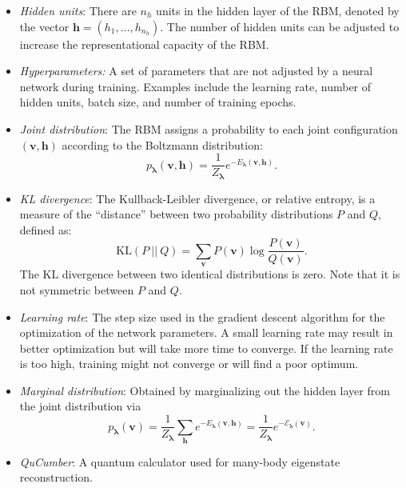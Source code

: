 \documentclass[submission, Phys, hidelnks]{SciPost}
\begin{document}
\begin{itemize}
\item \textit{Hidden units}: There are $n_h$ units in the hidden layer of the
RBM, denoted by the vector $\bm{h}=(h_1, \ldots, h_{n_h})$. The number of
hidden units can be adjusted to increase the representational capacity of
the RBM.\@

\item \textit{Hyperparameters:} A set of parameters that are not adjusted by a
neural network during training. Examples include the learning rate, number of
hidden units, batch size, and number of training epochs.

\item \textit{Joint distribution}: The RBM assigns a probability to each joint
configuration $(\bm v, \bm h)$ according to the Boltzmann distribution:
\begin{equation}
   p_{\bm{\lambda}}(\bm{v},\bm{h}) = \frac{1}{Z_{\bm{\lambda}}} e^{-E_{\bm{\lambda}}(\bm{v},\bm{h})}.
\end{equation}

\item \textit{KL divergence}: The Kullback-Leibler divergence, or relative
entropy, is a measure of the ``distance'' between two probability distributions
$P$ and $Q$, defined as:
\begin{equation}
\label{Eq.KLdiv}
\mathrm{KL}(P\:||\:Q)=\sum_{\bm{v}}P(\bm{v})\log\frac{P(\bm{v})}{Q(\bm{v})} .
\end{equation}
The KL divergence between two identical distributions is zero.
Note that it is not symmetric between $P$ and $Q$.

\item \textit{Learning rate}: The step size used in the gradient descent
algorithm for the optimization of the network parameters. A small learning rate
may result in better optimization but will take more time to converge. If the
learning rate is too high, training might not converge or will find a poor optimum.

\item \textit{Marginal distribution}: Obtained by marginalizing out the hidden layer from the joint distribution via
\begin{equation}\label{Eq:marginal_distribution}
   p_{\bm{\lambda}}(\bm{v}) = \frac{1}{Z_{\bm{\lambda}}} \sum_{\bm{h}} e^{-E_{\bm{\lambda}}(\bm{v},\bm{h})} = \frac{1}{Z_{\bm{\lambda}}} e^{- \mathcal{E}_{\bm{\lambda}}(\bm{v})}.
\end{equation}

\item \textit{QuCumber}: A quantum calculator used for many-body eigenstate reconstruction.


\end{itemize}
\end{document}
